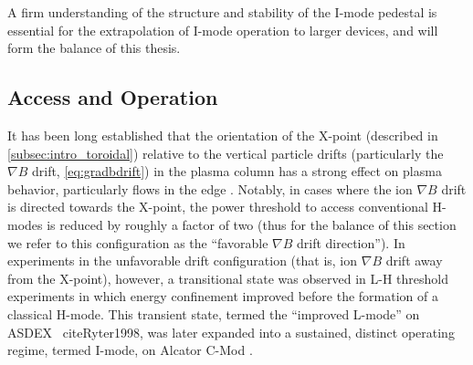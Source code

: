 \noindent A firm understanding of the structure and stability of the I-mode pedestal is essential for the extrapolation of I-mode operation to larger devices, and will form the balance of this thesis.

\subsection{Access and Operation}\label{subsec:hcr_imode_access}

It has been long established that the orientation of the X-point (described in \cref{subsec:intro_toroidal}) relative to the vertical particle drifts (particularly the $\nabla B$ drift, \cref{eq:gradbdrift}) in the plasma column has a strong effect on plasma behavior, particularly flows in the edge \cite{LaBombard2004,Fenzi2005,Hubbard2007,LaBombard2008}.  Notably, in cases where the ion $\nabla B$ drift is directed towards the X-point, the power threshold to access conventional H-modes is reduced by roughly a factor of two \cite{Carlstrom1998,Groebner1998,Suttrop2003} (thus for the balance of this section we refer to this configuration as the ``favorable $\nabla B$ drift direction'').  In experiments in the unfavorable drift configuration (that is, ion $\nabla B$ drift away from the X-point), however, a transitional state was observed in L-H threshold experiments in which energy confinement improved before the formation of a classical H-mode.  This transient state, termed the ``improved L-mode'' on ASDEX \
cite{Ryter1998}, was later expanded into a sustained, distinct operating regime, termed I-mode, on Alcator C-Mod \cite{Whyte2010,McDermott2009a,Hubbard2011}.

\begin{figure}[t]
 \pushtooutside
\end{figure}

